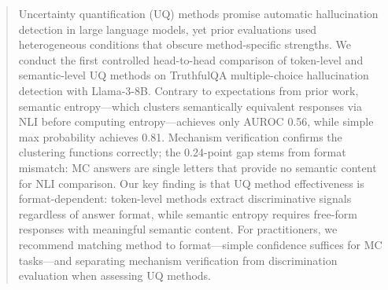 \begin{abstract}
Uncertainty quantification (UQ) methods promise automatic hallucination detection in large language models, yet prior evaluations used heterogeneous conditions that obscure method-specific strengths. We conduct the first controlled head-to-head comparison of token-level and semantic-level UQ methods on TruthfulQA multiple-choice hallucination detection with Llama-3-8B. Contrary to expectations from prior work, semantic entropy---which clusters semantically equivalent responses via NLI before computing entropy---achieves only AUROC 0.56, while simple max probability achieves 0.81. Mechanism verification confirms the clustering functions correctly; the 0.24-point gap stems from format mismatch: MC answers are single letters that provide no semantic content for NLI comparison. Our key finding is that UQ method effectiveness is format-dependent: token-level methods extract discriminative signals regardless of answer format, while semantic entropy requires free-form responses with meaningful semantic content. For practitioners, we recommend matching method to format---simple confidence suffices for MC tasks---and separating mechanism verification from discrimination evaluation when assessing UQ methods.
\end{abstract}
